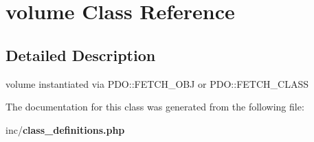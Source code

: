 \section{volume Class Reference}
\label{classvolume}


\subsection{Detailed Description}
volume instantiated via P\+D\+O\+::\+F\+E\+T\+C\+H\+\_\+\+O\+BJ or P\+D\+O\+::\+F\+E\+T\+C\+H\+\_\+\+C\+L\+A\+SS 

The documentation for this class was generated from the following file\+:\begin{DoxyCompactItemize}
\item 
inc/{\bf class\+\_\+definitions.\+php}\end{DoxyCompactItemize}
